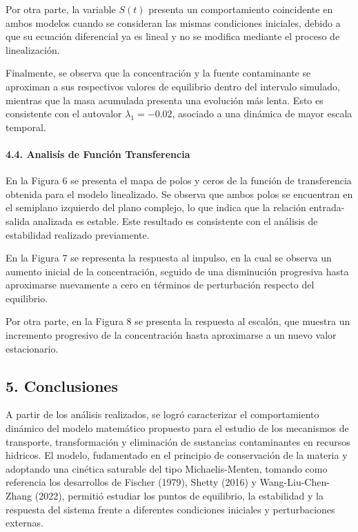 \documentclass[11pt]{article}
\begin{document}
Por otra parte, la variable \(S(t)\) presenta un comportamiento
coincidente en ambos modelos cuando se consideran las mismas condiciones
iniciales, debido a que su ecuación diferencial ya es lineal y no se
modifica mediante el proceso de linealización.

Finalmente, se observa que la concentración y la fuente contaminante se
aproximan a sus respectivos valores de equilibrio dentro del intervalo
simulado, mientras que la masa acumulada presenta una evolución más
lenta. Esto es consistente con el autovalor \(\lambda_1=-0.02\),
asociado a una dinámica de mayor escala temporal.

\paragraph{4.4. Analisís de Función
Transferencia}\label{analisuxeds-de-funciuxf3n-transferencia}

En la Figura 6 se presenta el mapa de polos y ceros de la función de
transferencia obtenida para el modelo linealizado. Se observa que ambos
polos se encuentran en el semiplano izquierdo del plano complejo, lo que
indica que la relación entrada-salida analizada es estable. Este
resultado es consistente con el análisis de estabilidad realizado
previamente.

En la Figura 7 se representa la respuesta al impulso, en la cual se
observa un aumento inicial de la concentración, seguido de una
disminución progresiva hasta aproximarse nuevamente a cero en términos
de perturbación respecto del equilibrio.

Por otra parte, en la Figura 8 se presenta la respuesta al escalón, que
muestra un incremento progresivo de la concentración hasta aproximarse a
un nuevo valor estacionario.

    \subsection{5. Conclusiones}\label{conclusiones}

A partir de los análisis realizados, se logró caracterizar el
comportamiento dinámico del modelo matemático propuesto para el estudio
de los mecanismos de transporte, transformación y eliminación de
sustancias contaminantes en recursos hidricos. El modelo, fudamentado en
el principio de conservación de la materia y adoptando una cinética
saturable del tipo Michaelis-Menten, tomando como referencia los
desarrollos de Fischer (1979), Shetty (2016) y Wang-Liu-Chen-Zhang
(2022), permitió estudiar los puntos de equilibrio, la estabilidad y la
respuesta del sistema frente a diferentes condiciones iniciales y
perturbaciones externas.
\end{document}
